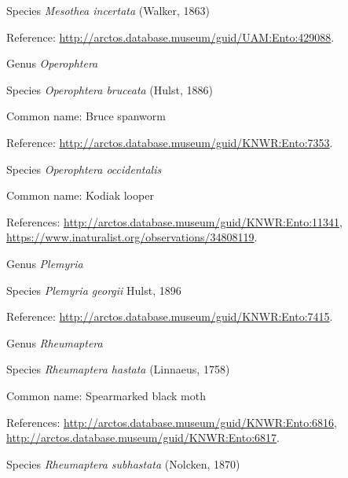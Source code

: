 \documentclass[9pt, article]{memoir}
\begin{document}
\begin{multicols}{2}
\vspace{6pt}\noindent\hspace{36pt}Species \textit{Mesothea incertata} (Walker, 1863)


Reference: 
\url{http://arctos.database.museum/guid/UAM:Ento:429088}.

\vspace{6pt}\noindent\hspace{30pt}Genus \textit{Operophtera}


\vspace{6pt}\noindent\hspace{36pt}Species \textit{Operophtera bruceata} (Hulst, 1886)


Common name: Bruce spanworm

Reference: 
\url{http://arctos.database.museum/guid/KNWR:Ento:7353}.

\vspace{6pt}\noindent\hspace{36pt}Species \textit{Operophtera occidentalis}


Common name: Kodiak looper

References: 
\url{http://arctos.database.museum/guid/KNWR:Ento:11341}, 
\url{https://www.inaturalist.org/observations/34808119}.

\vspace{6pt}\noindent\hspace{30pt}Genus \textit{Plemyria}


\vspace{6pt}\noindent\hspace{36pt}Species \textit{Plemyria georgii} Hulst, 1896


Reference: 
\url{http://arctos.database.museum/guid/KNWR:Ento:7415}.

\vspace{6pt}\noindent\hspace{30pt}Genus \textit{Rheumaptera}


\vspace{6pt}\noindent\hspace{36pt}Species \textit{Rheumaptera hastata} (Linnaeus, 1758)


Common name: Spearmarked black moth

References: 
\url{http://arctos.database.museum/guid/KNWR:Ento:6816}, 
\url{http://arctos.database.museum/guid/KNWR:Ento:6817}.

\vspace{6pt}\noindent\hspace{36pt}Species \textit{Rheumaptera subhastata} (Nolcken, 1870)



\end{multicols}
\end{document}
